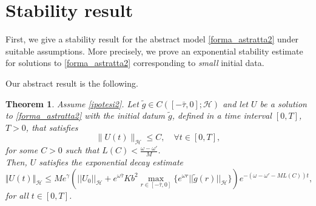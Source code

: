 \documentclass[11pt]{article}
\newtheorem{Theorem}{Theorem}[section]
\renewcommand{\leq}{\leqslant}
\renewcommand{\le}{\leqslant}
\begin{document}
\section{Stability result}

\setcounter{equation}{0}

First, we give a stability result for the abstract model \eqref{forma_astratta2} under suitable assumptions. More precisely, we prove an exponential stability estimate for solutions to \eqref{forma_astratta2} corresponding to {\em small} initial data.

Our abstract result is the following.
\begin{Theorem}\label{StabilityAbstract}
Assume \eqref{ipotesi2}. Let $\tilde g\in C([-\bar\tau, 0];\mathcal{H})$ and let $U$ be a solution to \eqref{forma_astratta2} with the initial datum $\tilde{g}$, defined in a time interval $[0,T]$, $T>0$, that satisfies 
\begin{equation}\label{boundedsolution}
	\lVert U(t)\rVert_{\mathcal{H}}\leq C,\quad \forall t\in [0,T],
\end{equation}
for some $C>0$ such that $L(C)<\frac{\omega-\omega'}{M}$.
\\Then, $U$ satisfies the exponential decay estimate 
\begin{equation}
\label{stimaesponenziale}
\Vert  U(t)\Vert_{\mathcal H}\le Me^{\gamma}\left(||U_0||_{\mathcal H}+e^{\omega\bar{\tau}}Kb^2\max_{r\in[-\bar{\tau},0]}\{e^{\omega r}||\tilde{g}(r)||_{\mathcal H}\}\right)e^{-(\omega-\omega'-ML(C))t},
\end{equation}
for all $t\in [0,T]$.
\end{Theorem}
\end{document}
